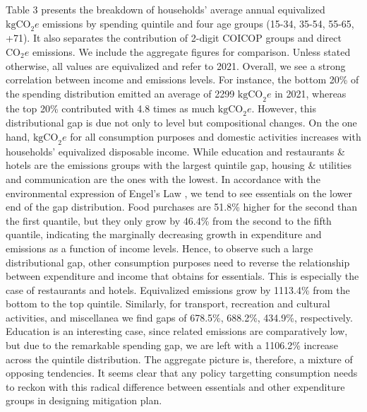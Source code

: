 \documentclass[
  10pt,
  twocolumn]{aft}
\begin{document}
Table 3 presents the breakdown of households' average annual equivalized
\(\text{kgCO}_2e\) emissions by spending quintile and four age groups
(15-34, 35-54, 55-65, +71). It also separates the contribution of
2-digit COICOP groups and direct \(\text{CO}_2e\) emissions. We include
the aggregate figures for comparison. Unless stated otherwise, all
values are equivalized and refer to 2021. Overall, we see a strong
correlation between income and emissions levels. For instance, the
bottom 20\% of the spending distribution emitted an average of 2299
\(\text{kgCO}_2e\) in 2021, whereas the top 20\% contributed with 4.8
times as much \(\text{kgCO}_2e\). However, this distributional gap is
due not only to level but compositional changes. On the one hand,
\(\text{kgCO}_2e\) for all consumption purposes and domestic activities
increases with households' equivalized disposable income. While
education and restaurants \& hotels are the emissions groups with the
largest quintile gap, housing \& utilities and communication are the
ones with the lowest. In accordance with the environmental expression of
Engel's Law
\citep{browningEngelLaw2018, levinsonEnvironmentalEngelCurves2015}, we
tend to see essentials on the lower end of the gap distribution. Food
purchases are 51.8\% higher for the second than the first quantile, but
they only grow by 46.4\% from the second to the fifth quantile,
indicating the marginally decreasing growth in expenditure and emissions
as a function of income levels. Hence, to observe such a large
distributional gap, other consumption purposes need to reverse the
relationship between expenditure and income that obtains for essentials.
This is especially the case of restaurants and hotels. Equivalized
emissions grow by 1113.4\% from the bottom to the top quintile.
Similarly, for transport, recreation and cultural activities, and
miscellanea we find gaps of 678.5\%, 688.2\%, 434.9\%, respectively.
Education is an interesting case, since related emissions are
comparatively low, but due to the remarkable spending gap, we are left
with a 1106.2\% increase across the quintile distribution. The aggregate
picture is, therefore, a mixture of opposing tendencies. It seems clear
that any policy targetting consumption needs to reckon with this radical
difference between essentials and other expenditure groups in designing
mitigation plan.
\end{document}
